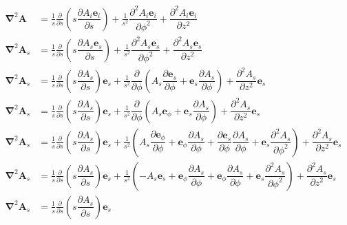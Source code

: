 \begin{align}
\boldsymbol{\nabla}^2\boldsymbol{A}
&=\frac{1}{s}\frac{\partial}{\partial s}\left(s\dfrac{{\partial A_i\boldsymbol{e}_i}}{\partial s}\right)
+\frac{1}{s^2}\dfrac{{\partial^2 A_i\boldsymbol{e}_i}}{\partial \phi^2}
+\dfrac{{\partial^2 A_i\boldsymbol{e}_i}}{\partial z^2}\nonumber\\
\boldsymbol{\nabla}^2\boldsymbol{A}_s
&=\frac{1}{s}\frac{\partial}{\partial s}\left(s\dfrac{{\partial A_s\boldsymbol{e}_s}}{\partial s}\right)
+\frac{1}{s^2}\dfrac{{\partial^2 A_s\boldsymbol{e}_s}}{\partial \phi^2}
+\dfrac{{\partial^2 A_s\boldsymbol{e}_s}}{\partial z^2}\nonumber\\
\boldsymbol{\nabla}^2\boldsymbol{A}_s
&=\frac{1}{s}\frac{\partial}{\partial s}\left(s\dfrac{{\partial A_s}}{\partial s}\right)\boldsymbol{e}_s
+\frac{1}{s^2}\dfrac{\partial}{\partial \phi}\left(A_s\dfrac{{\partial \boldsymbol{e}_s}}{\partial \phi}
+\boldsymbol{e}_s\dfrac{{\partial A_s}}{\partial \phi}\right)
+\dfrac{{\partial^2 A_s}}{\partial z^2}\boldsymbol{e}_s\nonumber\\
\boldsymbol{\nabla}^2\boldsymbol{A}_s
&=\frac{1}{s}\frac{\partial}{\partial s}\left(s\dfrac{{\partial A_s}}{\partial s}\right)\boldsymbol{e}_s
+\frac{1}{s^2}\dfrac{\partial}{\partial \phi}\left(A_s\boldsymbol{e}_\phi
+\boldsymbol{e}_s\dfrac{{\partial A_s}}{\partial \phi}\right)
+\dfrac{{\partial^2 A_s}}{\partial z^2}\boldsymbol{e}_s\nonumber\\
\boldsymbol{\nabla}^2\boldsymbol{A}_s
&=\frac{1}{s}\frac{\partial}{\partial s}\left(s\dfrac{{\partial A_s}}{\partial s}\right)\boldsymbol{e}_s
+\frac{1}{s^2}\left(A_s\dfrac{\partial \boldsymbol{e}_\phi}{\partial \phi}
+\boldsymbol{e}_\phi\dfrac{\partial A_s}{\partial \phi}
+\dfrac{\partial\boldsymbol{e}_s}{\partial \phi}\dfrac{{\partial A_s}}{\partial \phi}
+\boldsymbol{e}_s\dfrac{{\partial^2 A_s}}{\partial \phi^2}\right)
+\dfrac{{\partial^2 A_s}}{\partial z^2}\boldsymbol{e}_s\nonumber\\
\boldsymbol{\nabla}^2\boldsymbol{A}_s
&=\frac{1}{s}\frac{\partial}{\partial s}\left(s\dfrac{{\partial A_s}}{\partial s}\right)\boldsymbol{e}_s
+\frac{1}{s^2}\left(-A_s\boldsymbol{e}_s
+\boldsymbol{e}_\phi\dfrac{\partial A_s}{\partial \phi}
+\boldsymbol{e}_\phi\dfrac{{\partial A_s}}{\partial \phi}
+\boldsymbol{e}_s\dfrac{{\partial^2 A_s}}{\partial \phi^2}\right)
+\dfrac{{\partial^2 A_s}}{\partial z^2}\boldsymbol{e}_s\nonumber\\
\boldsymbol{\nabla}^2\boldsymbol{A}_s
&=\frac{1}{s}\frac{\partial}{\partial s}\left(s\dfrac{{\partial A_s}}{\partial s}\right)\boldsymbol{e}_s

\end{align}
